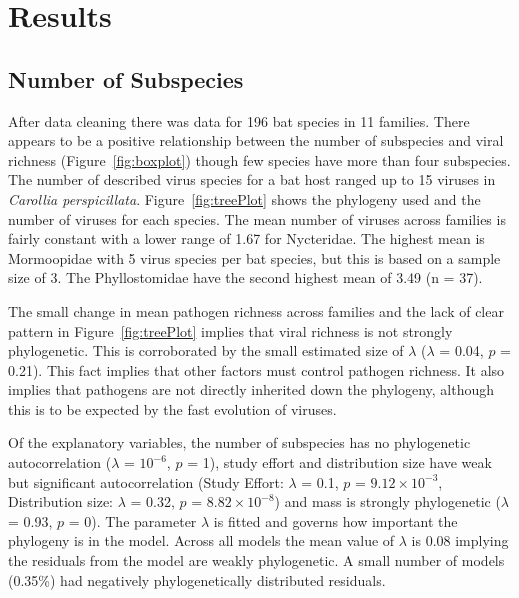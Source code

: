 \section{Results}


\subsection{Number of Subspecies}

After data cleaning there was data for 196 bat species in 11 families.
There appears to be a positive relationship between the number of subspecies and viral richness (Figure~\ref{fig:boxplot}) though few species have more than four subspecies. 
The number of described virus species for a bat host ranged up to 15 viruses in \emph{Carollia perspicillata}.
Figure~\ref{fig:treePlot} shows the phylogeny used and the number of viruses for each species.
The mean number of viruses across families is fairly constant with a lower range of 1.67 for Nycteridae.
The highest mean is Mormoopidae with 5 virus species per bat species, but this is based on a sample size of 3.
The Phyllostomidae have the second highest mean  of 3.49 (n = 37).

The small change in mean pathogen richness across families and the lack of clear pattern in Figure~\ref{fig:treePlot} implies that viral richness is not strongly phylogenetic. 
This is corroborated by the small estimated size of $\lambda$ ($\lambda$ = 0.04, $p$ = 0.21).
This fact implies that other factors must control pathogen richness.
It also implies that pathogens are not directly inherited down the phylogeny, although this is to be expected by the fast evolution of viruses.

Of the explanatory variables, the number of subspecies has no phylogenetic autocorrelation ($\lambda$ = \ensuremath{10^{-6}}, $p$ = 1), study effort and distribution size have weak but significant autocorrelation (Study Effort: $\lambda$ = 0.1, $p$ = \ensuremath{9.12\times 10^{-3}}, Distribution size: $\lambda$ = 0.32, $p$ = \ensuremath{8.82\times 10^{-8}}) and mass is strongly phylogenetic ($\lambda$ = 0.93, $p$ = 0). 
The parameter $\lambda$ is fitted and governs how important the phylogeny is in the model.
Across all models the mean value of $\lambda$ is 0.08 implying the residuals from the model are weakly phylogenetic.
A small number of models (0.35\%)  had negatively phylogenetically distributed residuals.

